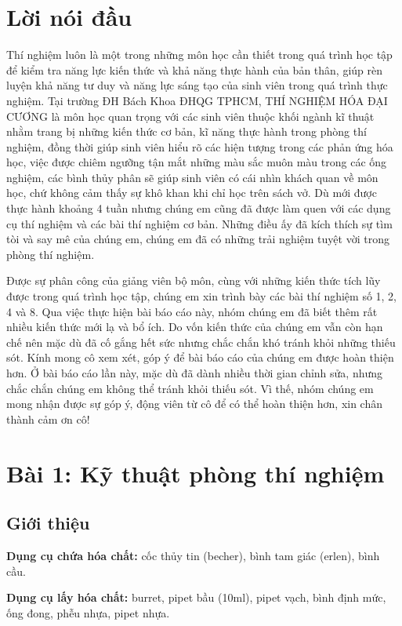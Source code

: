 \documentclass[12pt,a4paper]{report}
\begin{document}
\section{Lời nói đầu}
Thí nghiệm luôn là một trong những môn học cần thiết trong quá trình học tập để kiểm tra năng lực kiến thức và khả năng thực hành của bản thân, giúp rèn luyện khả năng tư duy và năng lực sáng tạo của sinh viên trong quá trình thực nghiệm. Tại trường ĐH Bách Khoa ĐHQG TPHCM, THÍ NGHIỆM HÓA ĐẠI CƯƠNG là môn học quan trọng với các sinh viên thuộc khối ngành kĩ thuật nhằm trang bị những kiến thức cơ bản, kĩ năng thực hành trong phòng thí nghiệm, đồng thời giúp sinh viên hiểu rõ các hiện tượng trong các phản ứng hóa học, việc được chiêm ngưỡng tận mắt những màu sắc muôn màu trong các ống nghiệm, các bình thủy phân sẽ giúp sinh viên có cái nhìn khách quan về môn học, chứ không cảm thấy sự khô khan khi chỉ học trên sách vở. Dù mới được thực hành khoảng 4 tuần nhưng chúng em cũng đã được làm quen với các dụng cụ thí nghiệm và các bài thí nghiệm cơ bản. Những điều ấy đã kích thích sự tìm tòi và say mê của chúng em, chúng em đã có những trải nghiệm tuyệt vời trong phòng thí nghiệm. 

Được sự phân công của giảng viên bộ môn, cùng với những kiến thức tích lũy được trong quá trình học tập, chúng em xin trình bày các bài thí nghiệm số 1, 2, 4 và 8. Qua việc thực hiện bài báo cáo này, nhóm chúng em đã biết thêm rất nhiều kiến thức mới lạ và bổ ích. Do vốn kiến thức của chúng em vẫn còn hạn chế nên mặc dù đã cố gắng hết sức nhưng chắc chắn khó tránh khỏi những thiếu sót. Kính mong cô xem xét, góp ý để bài báo cáo của chúng em được hoàn thiện hơn. Ở bài báo cáo lần này, mặc dù đã dành nhiều thời gian chỉnh sửa, nhưng chắc chắn chúng em không thể tránh khỏi thiếu sót. Vì thế, nhóm chúng em mong nhận được sự góp ý, động viên từ cô để có thể hoàn thiện hơn, xin chân thành cảm ơn cô!
\newpage
\section{Bài 1: Kỹ thuật phòng thí nghiệm}
    \subsection{Giới thiệu}

\textbf{Dụng cụ chứa hóa chất:} cốc thủy tin (becher), bình tam giác (erlen), bình cầu. 

\textbf{Dụng cụ lấy hóa chất:} burret, pipet bầu (10ml), pipet vạch, bình định mức, ống đong, phễu nhựa, pipet nhựa.
\end{document}
